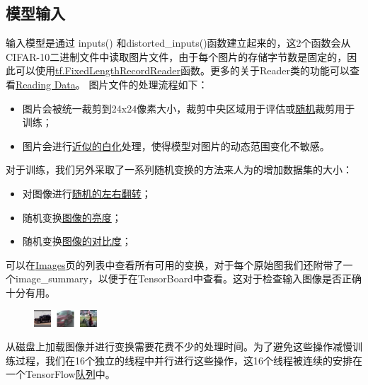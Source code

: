 \documentclass[11pt,fleqn]{book}
\begin{document}
{\subsection{模型输入}
输入模型是通过 inputs() 和distorted\_inputs()函数建立起来的，这2个函数会从CIFAR-10二进制文件中读取图片文件，由于每个图片的存储字节数是固定的，因此可以使用\href{https://www.tensorflow.org/api_docs/python/tf/FixedLengthRecordReader}{tf.FixedLengthRecordReader}函数。更多的关于Reader类的功能可以查看\href{https://www.tensorflow.org/api_guides/python/reading_data#reading_from_files}{Reading Data}。
图片文件的处理流程如下：
\begin{itemize}
\item 图片会被统一裁剪到24x24像素大小，裁剪中央区域用于评估或\href{https://www.tensorflow.org/api_docs/python/tf/random_crop}{随机}裁剪用于训练；
\item 图片会进行\href{https://www.tensorflow.org/api_docs/python/tf/image/per_image_standardization}{近似的白化}处理，使得模型对图片的动态范围变化不敏感。
\end{itemize}
对于训练，我们另外采取了一系列随机变换的方法来人为的增加数据集的大小：
\begin{itemize}
\item 对图像进行\href{https://www.tensorflow.org/api_docs/python/tf/image/random_flip_left_right}{随机的左右翻转}；
\item 随机变换\href{https://www.tensorflow.org/api_docs/python/tf/image/random_brightness}{图像的亮度}；
\item 随机变换\href{https://www.tensorflow.org/api_docs/python/tf/image/random_contrast}{图像的对比度}；
\end{itemize}
可以在\href{https://www.tensorflow.org/api_guides/python/image}{Images}页的列表中查看所有可用的变换，对于每个原始图我们还附带了一个image\_summary，以便于在TensorBoard中查看。这对于检查输入图像是否正确十分有用。
\begin{figure}[H]
\centering
\includegraphics{cifar_image_summary.png}
\end{figure}
从磁盘上加载图像并进行变换需要花费不少的处理时间。为了避免这些操作减慢训练过程，我们在16个独立的线程中并行进行这些操作，这16个线程被连续的安排在一个TensorFlow\href{https://www.tensorflow.org/api_docs/python/tf/train/shuffle_batch}{队列}中。
}
\end{document}
